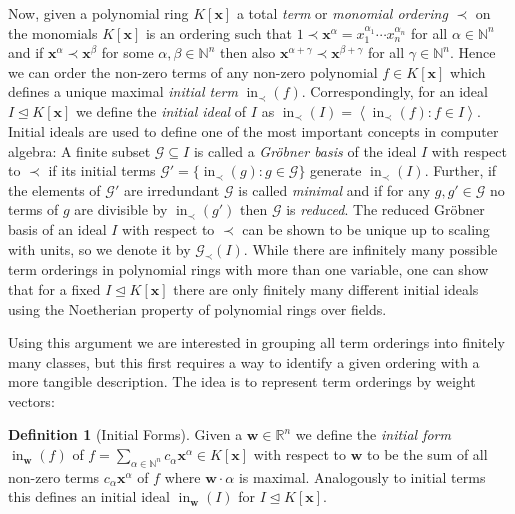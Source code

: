 \documentclass[
  paper=a4,
  titlepage,
  bibliography=totoc,
  listof=totoc,
  pagesize=pdftex
]{scrartcl}
\numberwithin{figure}{section}
\numberwithin{equation}{section}
\numberwithin{table}{section}
\newcommand*\setR{\mathds{R}}
\newcommand*\setN{\mathds{N}}
\newcommand*\ideal[1]{\left\langle #1 \right\rangle}
\let\vec\mathbf
\let\idealof\trianglelefteq
\DeclareMathOperator{\initial}{in}
\theoremstyle{definition}
\newtheorem{definition}{Definition}
\numberwithin{definition}{section}
\begin{document}
Now, given a polynomial ring $K[\vec x]$ a total \emph{term} or \emph{monomial ordering}
$\prec$ on the monomials $K[\vec x]$ is an ordering such that $1 \prec \vec x^\alpha =
x_1^{\alpha_1}\cdots x_n^{\alpha_n}$ for all $\alpha \in \setN^n$ and if $\vec x^\alpha
\prec \vec x^\beta$ for some $\alpha, \beta \in \setN^n$ then also $\vec x^{\alpha+\gamma}
\prec \vec x^{\beta+\gamma}$ for all $\gamma \in \setN^n$. Hence we can order the non-zero
terms of any non-zero polynomial $f \in K[\vec x]$ which defines a unique maximal
\emph{initial term} $\initial_\prec(f)$. Correspondingly, for an ideal $I \idealof K[\vec
x]$ we define the \emph{initial ideal} of $I$ as $\initial_\prec(I) =
\ideal{\initial_\prec(f) : f \in I}$. Initial ideals are used to define one of the most
important concepts in computer algebra: A finite subset $\mathcal G \subseteq I$ is called
a \emph{Gröbner basis} of the ideal $I$ with respect to $\prec$ if its initial terms
$\mathcal G' = \{ \initial_\prec(g) : g \in \mathcal G \}$ generate $\initial_\prec(I)$.
Further, if the elements of $\mathcal G'$ are irredundant $\mathcal G$ is called
\emph{minimal} and if for any $g, g' \in \mathcal G$ no terms of $g$ are divisible by
$\initial_\prec(g')$ then $\mathcal G$ is \emph{reduced}. The reduced Gröbner basis of an
ideal $I$ with respect to $\prec$ can be shown to be unique up to scaling with units, so
we denote it by $\mathcal G_\prec(I)$. While there are infinitely many possible term
orderings in polynomial rings with more than one variable, one can show that for a fixed
$I \idealof K[\vec x]$ there are only finitely many different initial ideals using the
Noetherian property of polynomial rings over fields.

Using this argument we are interested in grouping all term orderings into finitely many
classes, but this first requires a way to identify a given ordering with a more tangible
description. The idea is to represent term orderings by weight vectors:

\begin{definition}[Initial Forms]
  \label{def:initFormG}
  Given a $\vec w \in \setR^n$ we define the \emph{initial form} $\initial_{\vec w}(f)$ of
  $f = \sum_{\alpha\in\setN^n} c_\alpha \vec x^\alpha \in K[\vec x]$ with respect to $\vec
  w$ to be the sum of all non-zero terms $c_\alpha \vec x^\alpha$ of $f$ where $\vec
  w\cdot \alpha$ is maximal. Analogously to initial terms this defines an initial ideal
  $\initial_{\vec w}(I)$ for $I \idealof K[\vec x]$.
\end{definition}
\end{document}
